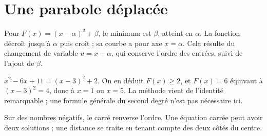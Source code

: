 \documentclass[../cours_2de.tex]{subfiles}
\begin{document}
\section{Une parabole déplacée}
\approfondissement Pour $F(x)=(x-\alpha)^2+\beta$, le minimum est $\beta$, atteint en $\alpha$.
La fonction décroît jusqu'à $\alpha$ puis croît ; sa courbe a pour axe $x=\alpha$.
Cela résulte du changement de variable $u=x-\alpha$, qui conserve l'ordre des entrées, suivi de l'ajout de $\beta$.
\begin{exemple}
$x^2-6x+11=(x-3)^2+2$.
On en déduit $F(x)\geq2$, et $F(x)=6$ équivaut à $(x-3)^2=4$, donc à $x=1$ ou $x=5$.
La méthode vient de l'identité remarquable ; une formule générale du second degré n'est pas nécessaire ici.
\end{exemple}
\begin{retenir}
Sur des nombres négatifs, le carré renverse l'ordre. Une équation carrée peut avoir deux solutions ; une distance se traite en tenant compte des deux côtés du centre.
\end{retenir}
\end{document}
